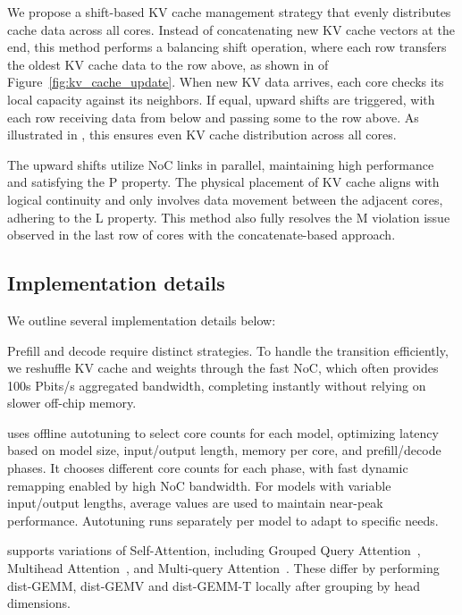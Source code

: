  We propose a shift-based KV cache management strategy that evenly distributes cache data across all cores. Instead of concatenating new KV cache vectors at the end, this method performs a balancing shift operation, where each row transfers the oldest KV cache data to the row above, as shown in  of Figure~\ref{fig:kv_cache_update}. When new KV data arrives, each core checks its local capacity against its neighbors. If equal, upward shifts are triggered, with each row receiving data from below and passing some to the row above. As illustrated in , this ensures even KV cache distribution across all cores.

The upward shifts utilize NoC links in parallel, maintaining high performance and satisfying the P property. The physical placement of KV cache aligns with logical continuity and only involves data movement between the adjacent cores, adhering to the L property. This method also fully resolves the M violation issue observed in the last row of cores with the concatenate-based approach.

    \vspace{-3mm}
\subsection{Implementation details}
    \vspace{-1mm}

We outline several implementation details below:

 Prefill and decode require distinct strategies. To handle the transition efficiently, we reshuffle KV cache and weights through the fast NoC, which often provides 100s Pbits/s aggregated bandwidth, completing instantly without relying on slower off-chip memory.

 \sys uses offline autotuning to select core counts for each model, optimizing latency based on model size, input/output length, memory per core, and prefill/decode phases. It chooses different core counts for each phase, with fast dynamic remapping enabled by high NoC bandwidth. For models with variable input/output lengths, average values are used to maintain near-peak performance. Autotuning runs separately per model to adapt to specific needs.

 \sys supports variations of Self-Attention, including Grouped Query Attention~\cite{gqa}, Multihead Attention~\cite{mha}, and Multi-query Attention~\cite{mqa}. These differ by performing dist-GEMM, dist-GEMV and dist-GEMM-T locally after grouping by head dimensions.